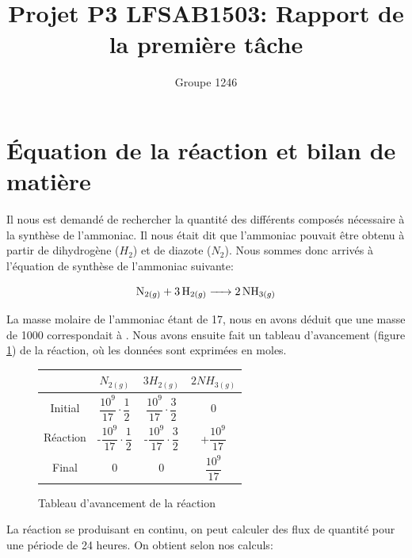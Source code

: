\documentclass[11pt,a4paper]{report}
\author{Groupe 1246}
\title{Projet P3 LFSAB1503: Rapport de la première tâche}
\begin{document}
\maketitle

\section*{Équation de la réaction et bilan de matière}

Il nous est demandé de rechercher la quantité des différents composés nécessaire à la synthèse de l'ammoniac.
Il nous était dit que l'ammoniac pouvait être obtenu à partir de dihydrogène ($H_2$) et de diazote ($N_2$).
Nous sommes donc arrivés à l'équation de synthèse de l'ammoniac suivante: 


 $$\ce{N_{2(g)} + 3H_{2(g)} -> 2NH_{3(g)}}$$

La masse molaire de l'ammoniac étant de \unit{17}{\gram\per\mole}, nous en avons déduit que une masse de \unit{1000}{\ton}
correspondait à \unit{}{\mole}. Nous avons ensuite fait un tableau d'avancement (figure \ref{tableau}) de la réaction,
où les données sont exprimées en moles.

\begin{figure}[h]
\centering
\begin{tabular}{|c|c|c|c|}
\hline 
 & $N_{2(g)}$ & $3H_{2(g)} $ & $2NH_{3(g)}$ \\ 
\hline 
Initial & $\dfrac{10^{9}}{17} \cdot \dfrac{1}{2}$ & $\dfrac{10^{9}}{17} \cdot \dfrac{3}{2}$ & 0 \\ 
\hline 
Réaction & -$\dfrac{10^{9}}{17} \cdot \dfrac{1}{2}$ & -$\dfrac{10^{9}}{17} \cdot \dfrac{3}{2}$ & +$\dfrac{10^{9}}{17}$ \\ 
\hline 
Final & 0 & 0 & $\dfrac{10^{9}}{17}$ \\ 
\hline 
\end{tabular} 
\caption{Tableau d'avancement de la réaction}
\label{tableau}
\end{figure}

La réaction se produisant en continu, on peut calculer des flux de quantité pour une période de 24 heures.
On obtient selon nos calculs:

\begin{itemize}
  \item{une consommation de $N_2$ égale à: $\dfrac{10^{9}}{17} \cdot \dfrac{1}{2} \cdot \dfrac{1}{3600 \cdot 24} \cong 340.41 $ \unit{}{\mole\per\second}.}
  \item{une consommation de $H_2$ égale à: $\dfrac{10^{9}}{17} \cdot \dfrac{3}{2} \cdot \dfrac{1}{3600 \cdot 24} \cong 1021.241 $\unit{}{\mole\per\second}
  \item{une production de $NH_3$ égale à: $\dfrac{10^{9}}{17}} \cdot \dfrac{1}{3600 \cdot 24} \cong 680.827$ \unit{}{\mole\per\second}
}}\end{itemize}
\end{document}
